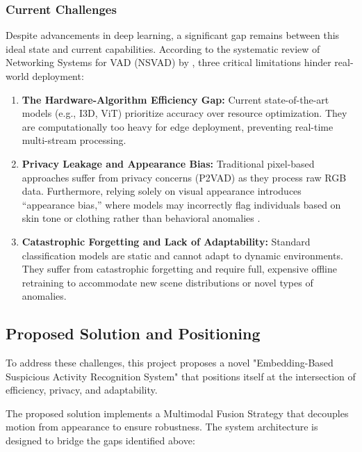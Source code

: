 \documentclass[12pt]{article}
\begin{document}
\subsubsection{Current Challenges}
Despite advancements in deep learning, a significant gap remains between this ideal state and current capabilities. According to the systematic review of Networking Systems for VAD (NSVAD) by \cite{liu2024networking}, three critical limitations hinder real-world deployment:

\begin{enumerate}
    \item \textbf{The Hardware-Algorithm Efficiency Gap:} Current state-of-the-art models (e.g., I3D, ViT) prioritize accuracy over resource optimization. They are computationally too heavy for edge deployment, preventing real-time multi-stream processing.
    
    \item \textbf{Privacy Leakage and Appearance Bias:} Traditional pixel-based approaches suffer from privacy concerns (P2VAD) as they process raw RGB data. Furthermore, relying solely on visual appearance introduces ``appearance bias,'' where models may incorrectly flag individuals based on skin tone or clothing rather than behavioral anomalies \citep{liu2025privacy}.
    
    \item \textbf{Catastrophic Forgetting and Lack of Adaptability:} Standard classification models are static and cannot adapt to dynamic environments. They suffer from catastrophic forgetting and require full, expensive offline retraining to accommodate new scene distributions or novel types of anomalies.
\end{enumerate}

\subsection{Proposed Solution and Positioning}
To address these challenges, this project proposes a novel "Embedding-Based Suspicious Activity Recognition System" that positions itself at the intersection of efficiency, privacy, and adaptability.

The proposed solution implements a Multimodal Fusion Strategy that decouples motion from appearance to ensure robustness. The system architecture is designed to bridge the gaps identified above:
\end{document}
